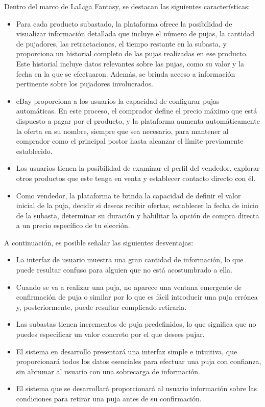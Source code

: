Dentro del marco de LaLiga Fantasy, se destacan las siguientes características:
\begin{itemize}
    \item Para cada producto subastado, la plataforma ofrece la posibilidad de visualizar información detallada que incluye el número de pujas, la cantidad de pujadores, las retractaciones, el tiempo restante en la subasta, y proporciona un historial completo de las pujas realizadas en ese producto. Este historial incluye datos relevantes sobre las pujas, como su valor y la fecha en la que se efectuaron. Además, se brinda acceso a información pertinente sobre los pujadores involucrados.
    \item eBay proporciona a los usuarios la capacidad de configurar pujas automáticas. En este proceso, el comprador define el precio máximo que está dispuesto a pagar por el producto, y la plataforma aumenta automáticamente la oferta en su nombre, siempre que sea necesario, para mantener al comprador como el principal postor hasta alcanzar el límite previamente establecido.
    \item Los usuarios tienen la posibilidad de examinar el perfil del vendedor, explorar otros productos que este tenga en venta y establecer contacto directo con él.
    \item Como vendedor, la plataforma te brinda la capacidad de definir el valor inicial de la puja, decidir si deseas recibir ofertas, establecer la fecha de inicio de la subasta, determinar su duración y habilitar la opción de compra directa a un precio específico de tu elección.
\end{itemize}

A continuación, es posible señalar las siguientes desventajas:
\begin{itemize}
    \item La interfaz de usuario muestra una gran cantidad de información, lo que puede resultar confuso para alguien que no está acostumbrado a ella.
    \item Cuando se va a realizar una puja, no aparece una ventana emergente de confirmación de puja o similar por lo que es fácil introducir una puja errónea y, posteriormente, puede resultar complicado retirarla.
    \item Las subastas tienen incrementos de puja predefinidos, lo que significa que no puedes especificar un valor concreto por el que desees pujar.
\end{itemize}

\begin{itemize}
    \item El sistema en desarrollo presentará una interfaz simple e intuitiva, que proporcionará todos los datos esenciales para efectuar una puja con confianza, sin abrumar al usuario con una sobrecarga de información.
    \item El sistema que se desarrollará proporcionará al usuario información sobre las condiciones para retirar una puja antes de su confirmación.
\end{itemize}